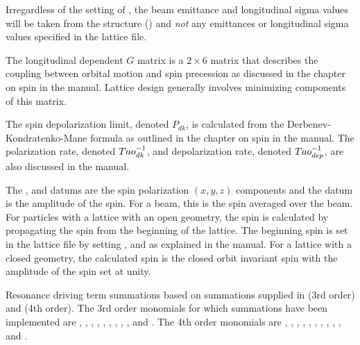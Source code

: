 \begin{description}
{Irregardless of the setting of , the beam emittance and longitudinal sigma
values will be taken from the  structure () and {\em not}
any emittances or longitudinal sigma values specified in the lattice file.

  \item[spin_g_matrix.$ij$ \hspace{0.2in} $1 \le i \le 2, \quad 1 \le j \le 6$] \Newline
The longitudinal dependent $G$ matrix is a $2\times6$ matrix that describes the coupling between
orbital motion and spin precession as discussed in the chapter on spin in the \bmad manual.  Lattice
design generally involves minimizing components of this matrix.


  \item[spin.polarization_limit, .polarization_rate, .depolarization_rate] \Newline
The spin depolarization limit, denoted $P_{dk}$, is calculated from the Derbenev-Kondratenko-Mane
formula as outlined in the chapter on spin in the \bmad manual. The polarization rate, denoted
${\sl Tao}_{dk}^{-1}$, and depolarization rate, denoted ${\sl Tao}_{dep}^{-1}$, are also discussed in the
\bmad manual.

  \item[spin.x, .y, .z, .amp] \Newline
The ,  and  datums are the spin polarization $(x, y, z)$ components
and the  datum is the amplitude of the spin. For a beam, this is the spin averaged over
the beam.  For particles with a lattice with an open geometry, the spin is calculated by propagating
the spin from the beginning of the lattice. The beginning spin is set in the lattice file by setting
,  and  as explained in the \bmad
manual. For a lattice with a closed geometry, the calculated spin is the closed orbit invariant spin
with the amplitude of the spin set at unity.

  \item[srdt.h<monomial>.\{r,i,a\}] \Newline
  Resonance driving term summations based on summations supplied in \cite{b:bengtsson} (3rd order)
  and \cite{b:wang} (4th order).  The 3rd order monomials for which summations have been implemented
  are , , , , , ,
, , , and .  The 4th order monomials are
, , , , , , , 
, , , and .

}
\end{description}
